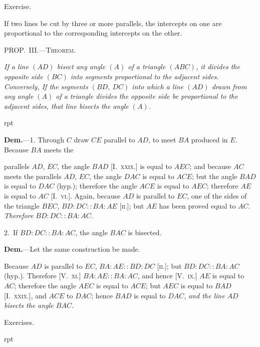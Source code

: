 \documentclass[oneside]{book}
\newcounter{wrapwidth}
\newcommand\mypropl[2]{
\bigskip\Needspace*{4\baselineskip}\begin{center}\textsc{#1}\end{center}
\hspace{\parindent}\emph{#2}\par\medskip
}
\newcommand\exhead[1]{
\Needspace*{5\baselineskip}\begin{center}
\textsf{#1}
\end{center}
}
\newcommand\imgflow[3]{
\setcounter{wrapwidth}{#1}

\begin{wrapfigure}[#2]{r}{\value{wrapwidth}pt}
\begin{center}
\vspace{-0.3in}

\end{center}
\end{wrapfigure}
}
\begin{document}
\exhead{Exercise.}

\begin{footnotesize}
If two lines be cut by three or more parallels, the intercepts
on one are proportional to the corresponding intercepts on the
other.
\par\end{footnotesize}

\mypropl{PROP\@.~III\@.---Theorem.}{If a line $(AD)$ bisect any angle $(A)$ of a triangle $(ABC)$,
it divides the opposite side $(BC)$ into segments proportional
to the adjacent sides. \textrm{Conversely,} If the segments
$(BD,\ DC)$ into which a line $(AD)$ drawn from any angle
$(A)$ of a triangle divides the opposite side be proportional
to the adjacent sides, that line bisects the angle $(A)$.}


\imgflow{108}{8}{f171}

\textbf{Dem.}---1. Through $C$ draw $CE$ parallel to $AD$, to
meet $BA$ produced in $E$. Because $BA$ meets the

parallels $AD$, $EC$, the angle $BAD$ [I.~\textsc{xxix}.] is equal
to $AEC$; and because $AC$ meets the parallels $AD$, $EC$,
the angle $DAC$ is equal to $ACE$;
but the angle $BAD$ is equal to
$DAC$ (hyp.); therefore the angle
$ACE$ is equal to $AEC$; therefore
$AE$ is equal to $AC$ [I.~\textsc{vi}.]. Again,
because $AD$ is parallel to $EC$, one
of the sides of the triangle $BEC$,
$BD : DC :: BA : AE$ [\textsc{ii.}];\label{VIii} but
$AE$ has been proved equal to $AC$.  \emph{Therefore
$BD : DC :: BA : AC$.}

2.~If $BD : DC :: BA : AC$, the angle $BAC$ is bisected.

\textbf{Dem.}---Let the same construction be made.

Because $AD$ is parallel to $EC$, $BA: AE :: BD : DC$
\textsc{[ii.]}; but $BD : DC:: BA : AC$ (hyp.). Therefore
[V.~\textsc{xi}.] $BA : AE :: BA : AC$, and hence [V.~\textsc{ix}.] $AE$
is equal to $AC$; therefore the angle $AEC$ is equal to
$ACE$; but $AEC$ is equal to $BAD$ [I.~\textsc{xxix}.], and $ACE$
to $DAC$; hence $BAD$ is equal to $DAC$, \textit{and the line $AD$
bisects the angle $BAC$.}

\exhead{Exercises.}


\imgflow{142}{9}{f172}
\end{document}

